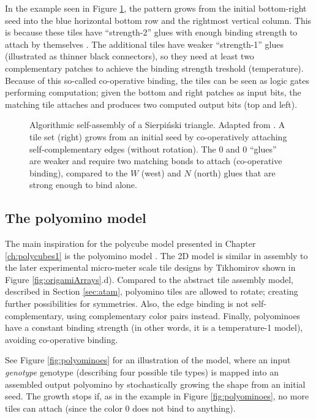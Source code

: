 In the example seen in Figure \ref{fig:atam}, the pattern grows from the initial bottom-right seed into the blue horizontal bottom row and the rightmost vertical column. This is because these tiles have ``strength-2'' glues with enough binding strength to attach by themselves \cite{doty2012theory}. The additional tiles have weaker ``strength-1'' glues (illustrated as thinner black connectors), so they need at least two complementary patches to achieve the binding strength treshold (temperature). Because of this so-called co-operative binding, the tiles can be seen as logic gates performing computation; given the bottom and right patches as input bits, the matching tile attaches and produces two computed output bits (top and left).



\begin{figure}[h]
  \centering
  \caption{Algorithmic self-assembly of a Sierpiński triangle. Adapted from \cite{doty2017}. A tile set (right) grows from an initial seed by co-operatively attaching self-complementary edges (without rotation). The \(0\) and \(0\) ``glues'' are weaker and require two matching bonds to attach (co-operative binding), compared to the \(W\) (west) and \(N\) (north) glues that are strong enough to bind alone.}
  \label{fig:atam}
\end{figure}

\subsection{The polyomino model}\label{sec:polyomino}

The main inspiration for the polycube model presented in Chapter \ref{ch:polycubes1} is the polyomino model \cite{ahnert2010self, johnston2011evolutionary}. The 2D model is similar in assembly to the later experimental micro-meter scale tile designs by Tikhomirov \cite{tikhomirov2017programmable} shown in Figure \ref{fig:origamiArrays}.d). Compared to the abstract tile assembly model, described in Section \ref{sec:atam}, polyomino tiles are allowed to rotate; creating further possibilities for symmetries. Also, the edge binding is not self-complementary, using complementary color pairs instead. Finally, polyominoes have a constant binding strength (in other words, it is a temperature-1 model), avoiding co-operative binding. 

See Figure \ref{fig:polyominoes} for an illustration of the model, where an input \emph{genotype} genotype (describing four possible tile types) is mapped into an assembled output polyomino by stochastically growing the shape from an initial seed. The growth stops if, as in the example in Figure \ref{fig:polyominoes}, no more tiles can attach (since the color \(0\) does not bind to anything).

